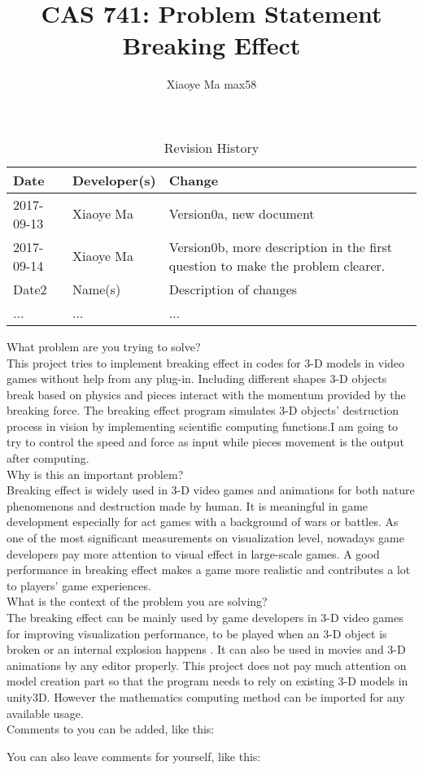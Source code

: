 \documentclass{article}
\title{CAS 741: Problem Statement\\Breaking Effect}
\author{Xiaoye Ma max58}
\date{}
\begin{document}
\maketitle

\begin{table}[hp]
\caption{Revision History} \label{TblRevisionHistory}
\begin{tabularx}{\textwidth}{llX}
\toprule
\textbf{Date} & \textbf{Developer(s)} & \textbf{Change}\\
\midrule
2017-09-13 & Xiaoye Ma & Version0a, new document\\
2017-09-14 & Xiaoye Ma & Version0b, more description in the first question to make the problem clearer.\\
Date2 & Name(s) & Description of changes\\
... & ... & ...\\
\bottomrule
\end{tabularx}
\end{table}

What problem are you trying to solve?\\

This project tries to implement breaking effect in codes for 3-D models in video games without help from any plug-in. Including different shapes 3-D objects break based on physics and pieces interact with the momentum provided by the breaking force. The breaking effect program simulates 3-D objects’ destruction process in vision by implementing scientific computing functions.I am going to try to control the speed and force as input while pieces movement is the output after computing.\\      

Why is this an important problem?\\

Breaking effect is widely used in 3-D video games and animations for both nature phenomenons and destruction made by human. It is meaningful in game development especially for act games with a background of wars or battles. As one of the most significant measurements on visualization level, nowadays game developers pay more attention to visual effect in large-scale games. A good performance in breaking effect makes a game more realistic and contributes a lot to players’ game experiences.\\ 

What is the context of the problem you are solving?\\

The breaking effect can be mainly used by game developers in 3-D video games for improving visualization performance, to be played when an 3-D object is broken or an internal explosion happens . It can also be used in movies and 3-D animations by any editor properly. This project does not pay much attention on model creation part so that the program needs to rely on existing 3-D models in unity3D. However the mathematics computing method can be imported for any available usage. \\

Comments to you can be added, like this:


You can also leave comments for yourself, like this:

\end{document}
